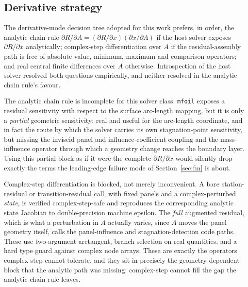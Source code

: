 \subsection{Derivative strategy}
\label{sec:derivatives}

The derivative-mode decision tree adopted for this work prefers, in order, the
analytic chain rule
$\partial R/\partial A = (\partial R/\partial x)(\partial x/\partial A)$ if
the host solver exposes $\partial R/\partial x$ analytically; complex-step
differentiation over $A$ if the residual-assembly path is free of absolute
value, minimum, maximum and comparison operators; and real central finite
differences over $A$ otherwise. Introspection of the host solver resolved both
questions empirically, and neither resolved in the analytic chain rule's
favour.

The analytic chain rule is incomplete for this solver class. \texttt{mfoil}
exposes a residual sensitivity with respect to the surface arc-length mapping,
but it is only a \emph{partial} geometric sensitivity: real and useful for the
arc-length coordinate, and in fact the route by which the solver carries its
own stagnation-point sensitivity, but missing the inviscid panel and
influence-coefficient coupling and the mass-influence operator through which a
geometry change reaches the boundary layer. Using this partial block as if it
were the complete $\partial R/\partial x$ would silently drop exactly the
terms the leading-edge failure mode of Section~\ref{sec:fm} is about.

Complex-step differentiation is blocked, not merely inconvenient. A bare
station-residual or transition-residual call, with fixed panels and a
complex-perturbed \emph{state}, is verified complex-step-safe and reproduces
the corresponding analytic state Jacobian to double-precision machine epsilon.
The \emph{full} augmented residual, which is what a perturbation in $A$
actually varies, since $A$ moves the panel geometry itself, calls the
panel-influence and stagnation-detection code paths. These use two-argument
arctangent, branch selection on real quantities, and a hard type guard against
complex node arrays. These are exactly the operators complex-step cannot
tolerate, and they sit in precisely the geometry-dependent block that the
analytic path was missing: complex-step cannot fill the gap the analytic chain
rule leaves.

